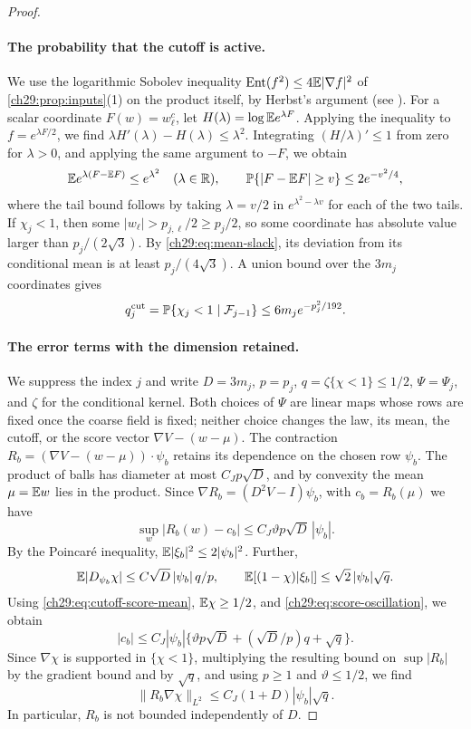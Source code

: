 \begin{proof}
\paragraph{The probability that the cutoff is active.}
We use the logarithmic Sobolev inequality $\operatorname{Ent}(f^2)\le4\mathbb E|\nabla f|^2$ of \cref{ch29:prop:inputs}(1) on the product itself, by Herbst's argument (see \cite{Ledoux1999}). For a scalar coordinate $F(w)=w_\ell^c$, let $H(\lambda)=\log\mathbb E e^{\lambda F}$. Applying the inequality to $f=e^{\lambda F/2}$, we find $\lambda H'(\lambda)-H(\lambda)\le\lambda^2$. Integrating $(H/\lambda)'\le1$ from zero for $\lambda>0$, and applying the same argument to $-F$, we obtain
\[
 \mathbb E e^{\lambda(F-\mathbb E F)}\le e^{\lambda^2}\quad(\lambda\in\mathbb R),\qquad \mathbb P\{|F-\mathbb E F|\ge v\}\le2e^{-v^2/4},
\]
where the tail bound follows by taking $\lambda=v/2$ in $e^{\lambda^2-\lambda v}$ for each of the two tails. If $\chi_j<1$, then some $|w_\ell|>p_{j,\ell}/2\ge p_j/2$, so some coordinate has absolute value larger than $p_j/(2\sqrt3)$. By \eqref{ch29:eq:mean-slack}, its deviation from its conditional mean is at least $p_j/(4\sqrt3)$. A union bound over the $3m_j$ coordinates gives
\begin{equation}\label{ch29:eq:cutoff-probability}
 q_j^{\rm cut}=\mathbb P\{\chi_j<1\mid\mathcal F_{j-1}\}\le6m_je^{-p_j^2/192}.
\end{equation}

\paragraph{The error terms with the dimension retained.}
We suppress the index $j$ and write $D=3m_j$, $p=p_j$, $q=\zeta\{\chi<1\}\le1/2$, $\Psi=\Psi_j$, and $\zeta$ for the conditional kernel. Both choices of $\Psi$ are linear maps whose rows are fixed once the coarse field is fixed; neither choice changes the law, its mean, the cutoff, or the score vector $\nabla V-(w-\mu)$. The contraction $R_b=(\nabla V-(w-\mu))\cdot\psi_b$ retains its dependence on the chosen row $\psi_b$. The product of balls has diameter at most $C_Jp\sqrt D$, and by convexity the mean $\mu=\mathbb E w$ lies in the product. Since $\nabla R_b=(D^2V-I)\psi_b$, with $c_b=R_b(\mu)$ we have
\begin{equation}\label{ch29:eq:score-oscillation}
 \sup_w|R_b(w)-c_b|\le C_J\vartheta p\sqrt D\,|\psi_b|.
\end{equation}
By the Poincaré inequality, $\mathbb E|\xi_b|^2\le2|\psi_b|^2$. Further,
\[
 \mathbb E|D_{\psi_b}\chi|\le C\sqrt D\,|\psi_b|\,q/p,\qquad \mathbb E[(1-\chi)|\xi_b|]\le\sqrt2\,|\psi_b|\sqrt q.
\]
Using \eqref{ch29:eq:cutoff-score-mean}, $\mathbb E\chi\ge1/2$, and \eqref{ch29:eq:score-oscillation}, we obtain
\[
 |c_b|\le C_J|\psi_b|\bigl\{\vartheta p\sqrt D+(\sqrt D/p)q+\sqrt q\bigr\}.
\]
Since $\nabla\chi$ is supported in $\{\chi<1\}$, multiplying the resulting bound on $\sup|R_b|$ by the gradient bound and by $\sqrt q$, and using $p\ge1$ and $\vartheta\le1/2$, we find
\begin{equation}\label{ch29:eq:dimension-score}
 \|R_b\nabla\chi\|_{L^2}\le C_J(1+D)|\psi_b|\sqrt q.
\end{equation}
In particular, $R_b$ is not bounded independently of $D$.


\end{proof}
